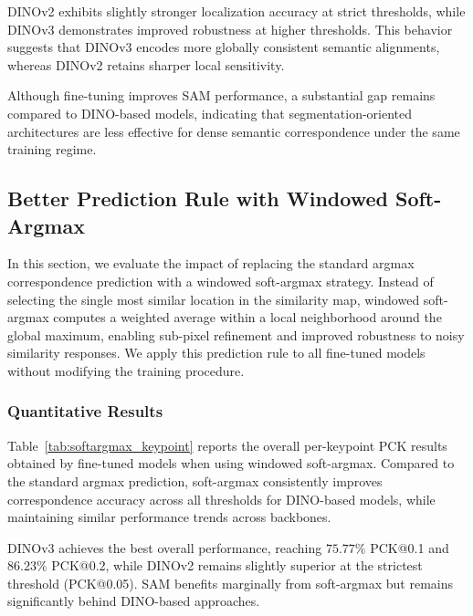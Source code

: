 DINOv2 exhibits slightly stronger localization accuracy at strict thresholds, while DINOv3 demonstrates improved robustness at higher thresholds.
This behavior suggests that DINOv3 encodes more globally consistent semantic alignments, whereas DINOv2 retains sharper local sensitivity.

Although fine-tuning improves SAM performance, a substantial gap remains compared to DINO-based models,
indicating that segmentation-oriented architectures are less effective for dense semantic correspondence under the same training regime.




\subsection{Better Prediction Rule with Windowed Soft-Argmax}

In this section, we evaluate the impact of replacing the standard argmax correspondence prediction with a windowed soft-argmax strategy.
Instead of selecting the single most similar location in the similarity map, windowed soft-argmax computes a weighted average within a local neighborhood
around the global maximum, enabling sub-pixel refinement and improved robustness to noisy similarity responses.
We apply this prediction rule to all fine-tuned models without modifying the training procedure.


\subsubsection{Quantitative Results}

Table~\ref{tab:softargmax_keypoint} reports the overall per-keypoint PCK results obtained by fine-tuned models when using windowed soft-argmax.
Compared to the standard argmax prediction, soft-argmax consistently improves correspondence accuracy across all thresholds for DINO-based models,
while maintaining similar performance trends across backbones.

DINOv3 achieves the best overall performance, reaching $75.77\%$ PCK@0.1 and $86.23\%$ PCK@0.2, while DINOv2 remains slightly superior at the
strictest threshold (PCK@0.05). SAM benefits marginally from soft-argmax but remains significantly behind DINO-based approaches.


